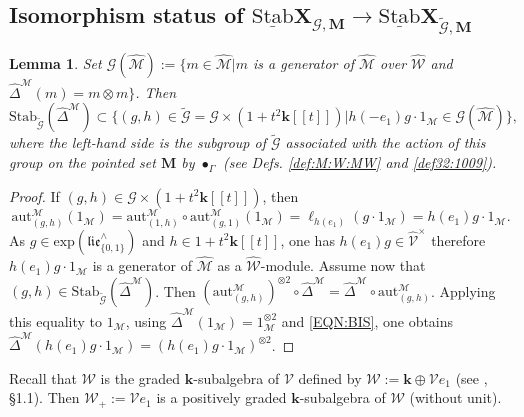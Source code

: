 \documentclass[10pt]{amsart}
\newtheorem{lem}[thm]{Lemma}
\numberwithin{equation}{subsection}
\begin{document}
\subsection{Isomorphism status of $\underline{\mathrm{Stab}}\mathbf X_{\mathcal G,\mathbf M}\to
\underline{\mathrm{Stab}}\mathbf X_{\tilde{\mathcal G},\mathbf M}$}\label{sect:4:1:5786}

\begin{lem}
Set $\mathcal G(\hat{\mathcal M}):=\{m\in\hat{\mathcal M}|m$ is a generator of $\hat{\mathcal M}$ over $\hat{\mathcal W}$ and 
$\hat\Delta^{\mathcal M}(m)=m\otimes m\}$. Then 
\begin{equation}\label{FIRSTSTEP:BIS}
    \mathrm{Stab}_{\tilde{\mathcal G}}(\hat\Delta^{\mathcal M}) \subset \{(g,h)\in \tilde{\mathcal G}=\mathcal G\times(1+t^2\mathbf k[[t]]) | 
    h(-e_1)g\cdot 1_{\mathcal M}\in\mathcal G(\hat{\mathcal M})\},  
\end{equation}
where the left-hand side is the subgroup of $\tilde{\mathcal G}$ associated with the action of this group on the pointed set $\mathbf M$ 
by $\bullet_\Gamma$ (see Defs. \ref{def:M:W:MW} and \ref{def32:1009}).  
\end{lem}

\begin{proof}
If $(g,h)\in\mathcal G\times(1+t^2\mathbf k[[t]])$, then 
\begin{equation}\label{EQN:BIS}
    \mathrm{aut}^{\mathcal M}_{(g,h)}(1_{\mathcal M})=\mathrm{aut}^{\mathcal M}_{(1,h)}\circ 
    \mathrm{aut}^{\mathcal M}_{(g,1)}(1_{\mathcal M})=\ell_{h(e_1)}(g\cdot 1_{\mathcal M})=h(e_1)g\cdot 1_{\mathcal M}. 
\end{equation} 
As $g \in \mathrm{exp}(\mathfrak{lie}_{\{0,1\}}^\wedge)$ and $h\in 1+t^2\mathbf k[[t]]$, one has $h(e_1)g\in\hat{\mathcal V}^\times$ therefore 
$h(e_1)g\cdot 1_{\mathcal M}$ 
is a generator of $\hat{\mathcal M}$ as a $\hat{\mathcal W}$-module. Assume now that 
$(g,h)\in\mathrm{Stab}_{\tilde{\mathcal G}}(\hat\Delta^{\mathcal M})$. 
Then $(\mathrm{aut}^{\mathcal M}_{(g,h)})^{\otimes 2}\circ \hat\Delta^{\mathcal M}=\hat\Delta^{\mathcal M}\circ
\mathrm{aut}^{\mathcal M}_{(g,h)}$. Applying this equality to $1_{\mathcal M}$, using $\hat\Delta^{\mathcal M}(1_{\mathcal M})
=1_{\mathcal M}^{\otimes 2}$ and \eqref{EQN:BIS}, one obtains $\hat\Delta^{\mathcal M}(h(e_1)g\cdot 1_{\mathcal M})=
(h(e_1)g\cdot 1_{\mathcal M})^{\otimes 2}$. 
\end{proof}

Recall that $\mathcal W$ is the graded $\mathbf k$-subalgebra of $\mathcal V$ defined by 
$\mathcal W:=\mathbf k\oplus\mathcal V e_1$ (see \cite{EF1}, \S1.1). Then $\mathcal W_+:=\mathcal V e_1$
is a positively graded $\mathbf k$-subalgebra of $\mathcal W$ (without unit). 
\end{document}
